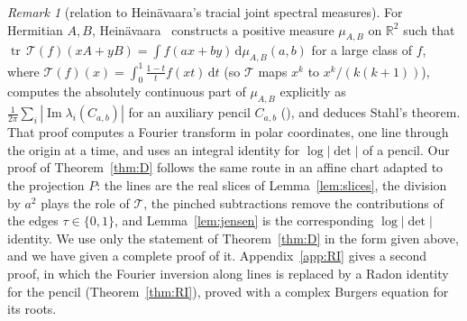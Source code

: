 \documentclass[11pt]{amsart}
\theoremstyle{definition}
\theoremstyle{remark}
\newtheorem{remark}[theorem]{Remark}
\numberwithin{equation}{section}
\newcommand{\R}{\mathbb{R}}
\newcommand{\tr}{\operatorname{tr}}
\renewcommand{\Im}{\operatorname{Im}}
\newcommand{\dd}{\,\mathrm{d}}
\begin{document}
\begin{remark}[relation to Hein\"avaara's tracial joint spectral measures]\label{rem:heinavaara}
For Hermitian $A,B$, Hein\"avaara~\cite{He} constructs a positive measure $\mu_{A,B}$ on $\R^2$ such that
$\tr\,\mathcal{T}(f)(xA+yB)=\int f(ax+by)\dd\mu_{A,B}(a,b)$ for a large class of $f$, where
$\mathcal T(f)(x)=\int_0^1\frac{1-t}tf(xt)\dd t$ (so $\mathcal T$ maps $x^k$ to $x^k/(k(k+1))$), computes the absolutely
continuous part of $\mu_{A,B}$ explicitly as $\frac1{2\pi}\sum_i|\Im\lambda_i(C_{a,b})|$ for an auxiliary pencil
$C_{a,b}$ (\cite[Theorem~3.1]{He}), and deduces Stahl's theorem. That proof computes a Fourier transform in polar coordinates,
one line through the origin at a time, and uses an integral identity for $\log|\det|$ of a pencil. Our proof of
Theorem~\ref{thm:D} follows the same route in an affine chart adapted to the projection $P$: the lines are the real
slices of Lemma~\ref{lem:slices}, the division by $a^2$ plays the role of $\mathcal T$, the pinched subtractions remove
the contributions of the edges $\tau\in\{0,1\}$, and Lemma~\ref{lem:jensen} is the corresponding $\log|\det|$ identity. We
use only the statement of Theorem~\ref{thm:D} in the form given above, and we have given a complete proof of it.
Appendix~\ref{app:RI} gives a second proof, in which the Fourier inversion along lines is replaced by a Radon identity
for the pencil (Theorem~\ref{thm:RI}), proved with a complex Burgers equation for its roots.
\end{remark}
\end{document}
